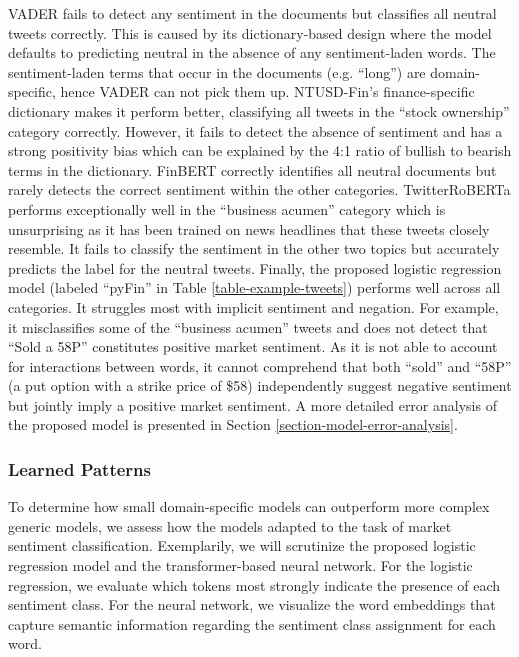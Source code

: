 

VADER fails to detect any sentiment in the documents but classifies all neutral tweets correctly. This is caused by its dictionary-based design where the model defaults to predicting neutral in the absence of any sentiment-laden words. The sentiment-laden terms that occur in the documents (e.g. ``long'') are domain-specific, hence VADER can not pick them up. NTUSD-Fin's finance-specific dictionary makes it perform better, classifying all tweets in the ``stock ownership'' category correctly. However, it fails to detect the absence of sentiment and has a strong positivity bias which can be explained by the 4:1 ratio of bullish to bearish terms in the dictionary. FinBERT correctly identifies all neutral documents but rarely detects the correct sentiment within the other categories. TwitterRoBERTa performs exceptionally well in the ``business acumen'' category which is unsurprising as it has been trained on news headlines that these tweets closely resemble. It fails to classify the sentiment in the other two topics but accurately predicts the label for the neutral tweets. Finally, the proposed logistic regression model (labeled ``pyFin'' in Table \ref{table-example-tweets}) performs well across all categories. It struggles most with implicit sentiment and negation. For example, it misclassifies some of the ``business acumen'' tweets and does not detect that ``Sold a 58P'' constitutes positive market sentiment. As it is not able to account for interactions between words, it cannot comprehend that both ``sold'' and ``58P'' (a put option with a strike price of \$58) independently suggest negative sentiment but jointly imply a positive market sentiment. A more detailed error analysis of the proposed model is presented in Section \ref{section-model-error-analysis}.


\subsubsection{Learned Patterns}
\label{section-learned-patterns}
To determine how small domain-specific models can outperform more complex generic models, we assess how the models adapted to the task of market sentiment classification. Exemplarily, we will scrutinize the proposed logistic regression model and the transformer-based neural network. For the logistic regression, we evaluate which tokens most strongly indicate the presence of each sentiment class. For the neural network, we visualize the word embeddings that capture semantic information regarding the sentiment class assignment for each word.

